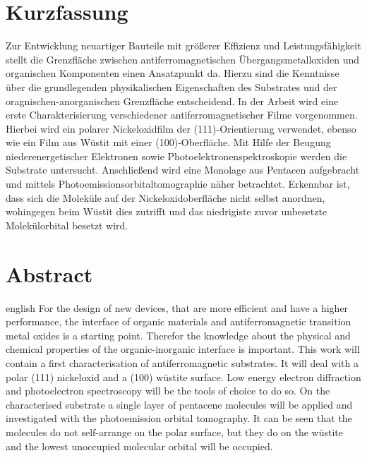\thispagestyle{plain}

\section*{Kurzfassung}
Zur Entwicklung neuartiger Bauteile mit größerer Effizienz und Leistungsfähigkeit stellt die Grenzfläche zwischen antiferromagnetischen Übergangsmetalloxiden und organischen Komponenten einen Ansatzpunkt da.
Hierzu sind die Kenntnisse über die grundlegenden physikalischen Eigenschaften des Substrates und der oragnischen-anorganischen Grenzfläche entscheidend.
In der Arbeit wird eine erste Charakterisierung verschiedener antiferromagnetischer Filme vorgenommen.
Hierbei wird ein polarer Nickeloxidfilm der (111)-Orientierung verwendet, ebenso wie ein Film aus Wüstit mit einer (100)-Oberfläche.
Mit Hilfe der Beugung niederenergetischer Elektronen sowie Photoelektronenspektroskopie werden die Substrate untersucht.
Anschließend wird eine Monolage aus Pentacen aufgebracht und mittels Photoemissionsorbitaltomographie näher betrachtet.
Erkennbar ist, dass sich die Moleküle auf der Nickeloxidoberfläche nicht selbst anordnen, wohingegen beim Wüstit dies zutrifft und das niedrigiste zuvor unbesetzte Molekülorbital besetzt wird.

\section*{Abstract}
\begin{foreignlanguage}{english}
For the design of new devices, that are more efficient and have a higher performance, the interface of organic materials and antiferromagnetic transition metal oxides is a starting point.
Therefor the knowledge about the physical and chemical properties of the organic-inorganic interface is important.
This work will contain a first characterisation of antiferromagnetic substrates.
It will deal with a polar (111) nickeloxid and a (100) wüstite surface.
Low energy electron diffraction and photoelectron spectroscopy will be the tools of choice to do so.
On the characterised substrate a single layer of pentacene molecules will be applied and investigated with the photoemission orbital tomography.
It can be seen that the molecules do not self-arrange on the polar surface, but they do on the wüstite and the lowest unoccupied molecular orbital will be occupied.
\end{foreignlanguage}
